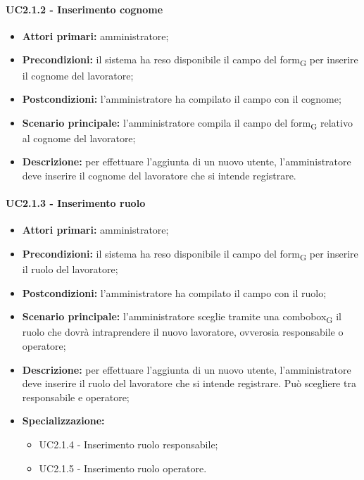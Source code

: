 \paragraph{UC2.1.2 - Inserimento cognome}

\begin{itemize}
	\item 	\textbf{Attori primari:} amministratore;
	\item 	\textbf{Precondizioni:} il sistema ha reso disponibile il campo del form\textsubscript{G} per inserire il cognome del lavoratore;
	\item 	\textbf{Postcondizioni:} l'amministratore ha compilato il campo con il cognome;
	\item 	\textbf{Scenario principale:} l'amministratore compila il campo del form\textsubscript{G} relativo al cognome del lavoratore;
	\item 	\textbf{Descrizione:} per effettuare l'aggiunta di un nuovo utente, l'amministratore deve inserire il cognome del lavoratore che si intende registrare.
	
\end{itemize}

\paragraph{UC2.1.3 - Inserimento ruolo}

\begin{itemize}
	\item 	\textbf{Attori primari:} amministratore;
	\item 	\textbf{Precondizioni:} il sistema ha reso disponibile il campo del form\textsubscript{G} per inserire il ruolo del lavoratore;
	\item 	\textbf{Postcondizioni:} l'amministratore ha compilato il campo con il ruolo;
	\item 	\textbf{Scenario principale:} l'amministratore sceglie tramite una combobox\textsubscript{G} il ruolo che dovrà intraprendere il nuovo lavoratore, ovverosia responsabile o operatore;
	\item 	\textbf{Descrizione:} per effettuare l'aggiunta di un nuovo utente, l'amministratore deve inserire il ruolo del lavoratore che si intende registrare. Può scegliere tra responsabile e operatore;
	\item  \textbf{Specializzazione:} 
	\begin{itemize}
		\item UC2.1.4 - Inserimento ruolo responsabile;
		\item UC2.1.5 - Inserimento ruolo operatore.
	\end{itemize}
	
\end{itemize}

